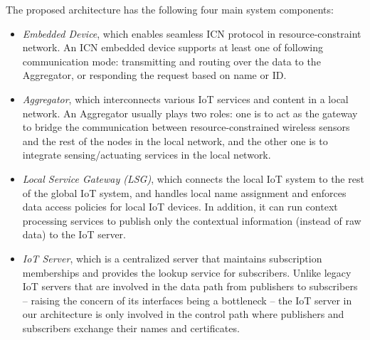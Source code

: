 The proposed architecture has the following four main system components:
\begin{itemize}
\item{\em Embedded Device}, which enables seamless ICN protocol in resource-constraint network. An ICN embedded device supports at least one of following communication mode: transmitting and routing over the data to the Aggregator, or responding the request based on name or ID.
\item{\em Aggregator}, which interconnects various IoT services and content in a local network. An Aggregator usually plays two roles: one is to act as the gateway to bridge the communication between resource-constrained wireless sensors and the rest of the nodes in the local network,  and the other one is to integrate sensing/actuating services in the local network.


\item{\em Local Service Gateway (LSG)}, which connects the local IoT system to the rest of the global IoT system, and handles local name assignment and enforces  data access policies for local IoT devices. In addition, it can run context processing services to publish only the contextual information (instead of raw data) to the IoT server.

\item{\em IoT Server}, which is a centralized server that maintains subscription memberships and provides the lookup service for subscribers. Unlike legacy IoT servers that are involved in the data path from publishers to subscribers -- raising the concern of its interfaces being a bottleneck -- the IoT server in our architecture is only involved in the control path where publishers and subscribers exchange their names and certificates.

\end{itemize}

